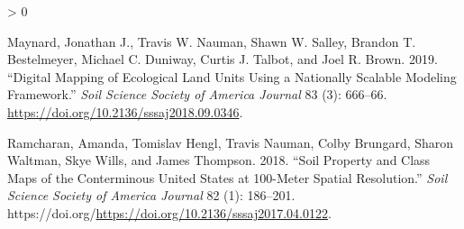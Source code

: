 \documentclass[
  ignorenonframetext,
]{beamer}
\newlength{\cslhangindent}
\newenvironment{CSLReferences}[2] %
 {%
  \setlength{\parindent}{0pt}
  \ifodd #1 \everypar{\setlength{\hangindent}{\cslhangindent}}\ignorespaces\fi
  \ifnum #2 > 0
  \setlength{\parskip}{#2\baselineskip}
  \fi
 }%
 {}
\begin{document}
\begin{frame}
\begin{CSLReferences}{1}{0}
\leavevmode\hypertarget{ref-maynard2019}{}%
Maynard, Jonathan J., Travis W. Nauman, Shawn W. Salley, Brandon T.
Bestelmeyer, Michael C. Duniway, Curtis J. Talbot, and Joel R. Brown.
2019. {``Digital {Mapping} of {Ecological} {Land} {Units} Using a
{Nationally} {Scalable} {Modeling} {Framework}.''} \emph{Soil Science
Society of America Journal} 83 (3): 666--66.
\url{https://doi.org/10.2136/sssaj2018.09.0346}.

\leavevmode\hypertarget{ref-ramcharan2018}{}%
Ramcharan, Amanda, Tomislav Hengl, Travis Nauman, Colby Brungard, Sharon
Waltman, Skye Wills, and James Thompson. 2018. {``Soil Property and
Class Maps of the Conterminous United States at 100-Meter Spatial
Resolution.''} \emph{Soil Science Society of America Journal} 82 (1):
186--201.
https://doi.org/\url{https://doi.org/10.2136/sssaj2017.04.0122}.

\end{CSLReferences}
\end{frame}
\end{document}
